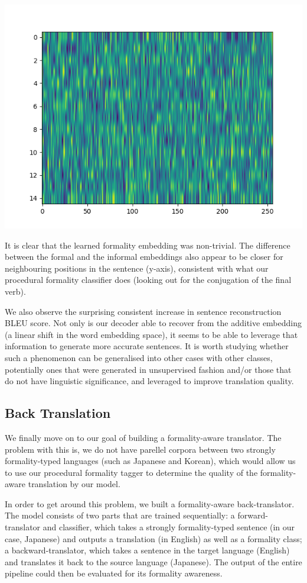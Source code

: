 \documentclass[11pt]{article}
\begin{document}
\includegraphics{images/formality_embedding.png}

It is clear that the learned formality embedding was non-trivial. The difference between the formal and the informal embeddings also appear to be closer for neighbouring positions in the sentence (y-axis), consistent with what our procedural formality classifier does (looking out for the conjugation of the final verb).

We also observe the surprising consistent increase in sentence reconstruction BLEU score. Not only is our decoder able to recover from the additive embedding (a linear shift in the word embedding space), it seems to be able to leverage that information to generate more accurate sentences. It is worth studying whether such a phenomenon can be generalised into other cases with other classes, potentially ones that were generated in unsupervised fashion and/or those that do not have linguistic significance, and leveraged to improve translation quality.

\subsection{Back Translation}

We finally move on to our goal of building a formality-aware translator. The problem with this is, we do not have parellel corpora between two strongly formality-typed languages (such as Japanese and Korean), which would allow us to use our procedural formality tagger to determine the quality of the formality-aware translation by our model. 

In order to get around this problem, we built a formality-aware back-translator. The model consists of two parts that are trained sequentially: a forward-translator and classifier, which takes a strongly formality-typed sentence (in our case, Japanese) and outputs a translation (in English) as well as a formality class; a backward-translator, which takes a sentence in the target language (English) and translates it back to the source language (Japanese). The output of the entire pipeline could then be evaluated for its formality awareness.
\end{document}
